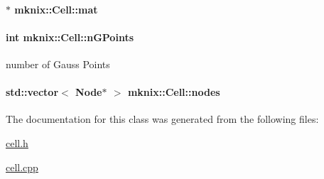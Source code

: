 \hypertarget{classmknix_1_1_cell_a83ca13ff89196b3ab378d2a28820a08e}{
\paragraph[{mat}]{$\ast$ mknix\-::\-Cell\-::mat\hspace{0.3cm}{\ttfamily [protected]}}}\label{classmknix_1_1_cell_a83ca13ff89196b3ab378d2a28820a08e}
\hypertarget{classmknix_1_1_cell_a7d406d6e6f58c14da07387723986ae38}{
\paragraph[{n\-G\-Points}]{\setlength{\rightskip}{0pt plus 5cm}int mknix\-::\-Cell\-::n\-G\-Points\hspace{0.3cm}{\ttfamily [protected]}}}\label{classmknix_1_1_cell_a7d406d6e6f58c14da07387723986ae38}
number of Gauss Points \hypertarget{classmknix_1_1_cell_a6afd7987e2b95a27ec9229caf2244015}{
\paragraph[{nodes}]{\setlength{\rightskip}{0pt plus 5cm}std\-::vector$<$ {\bf Node}$\ast$ $>$ mknix\-::\-Cell\-::nodes\hspace{0.3cm}{\ttfamily [protected]}}}\label{classmknix_1_1_cell_a6afd7987e2b95a27ec9229caf2244015}


The documentation for this class was generated from the following files\-:\begin{DoxyCompactItemize}
\item 
\hyperlink{cell_8h}{cell.\-h}\item 
\hyperlink{cell_8cpp}{cell.\-cpp}\end{DoxyCompactItemize}
